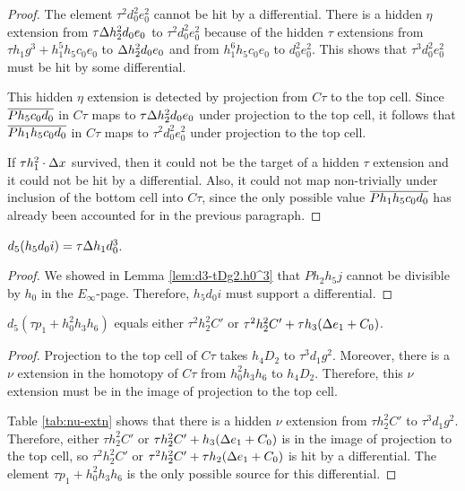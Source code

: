 \begin{proof}
The element $\tau^2 d_0^2 e_0^2$ cannot be hit by a differential.
There is a hidden $\eta$ extension
from $\tau \Delta h_2^2 d_0 e_0$ to $\tau^2 d_0^2 e_0^2$
because of the hidden $\tau$ extensions
from $\tau h_1 g^3 + h_1^5 h_5 c_0 e_0$ to
$\Delta h_2^2 d_0 e_0$ and
from $h_1^6 h_5 c_0 e_0$ to $d_0^2 e_0^2$.
This shows that $\tau^3 d_0^2 e_0^2$ must be hit by some differential.

This hidden $\eta$ extension is detected by
projection from $C\tau$ to the top cell.
Since $\overline{P h_5 c_0 d_0}$ in $C\tau$ maps to
$\tau \Delta h_2^2 d_0 e_0$ under projection to the top cell,
it follows that $\overline{P h_1 h_5 c_0 d_0}$ in $C\tau$
maps to $\tau^2 d_0^2 e_0^2$ under projection to the top cell.

If $\tau h_1^2 \cdot \Delta x$ survived, then it could not be the target of
a hidden $\tau$ extension and it could not be hit by a differential.
Also, it could not map non-trivially under inclusion of
the bottom cell into $C\tau$, since the only possible value
$\overline{P h_1 h_5 c_0 d_0}$ has already been accounted for 
in the previous paragraph.
\end{proof}

\begin{lemma}
\label{lem:d5-h5d0i}
$d_5(h_5 d_0 i) = \tau \Delta h_1 d_0^3$.
\end{lemma}

\begin{proof}
We showed in Lemma \ref{lem:d3-tDg2.h0^3}
that $P h_2 h_5 j$ cannot be divisible by $h_0$ in the $E_\infty$-page.
Therefore, $h_5 d_0 i$ must support a differential.
\end{proof}

\begin{lemma}
\label{lem:d5-tp1+h0^2h3h6}
$d_5(\tau p_1 + h_0^2 h_3 h_6)$ equals either
$\tau^2 h_2^2 C'$ or $\tau^2 h_2^2 C' + \tau h_3(\Delta e_1 + C_0)$.
\end{lemma}

\begin{proof}
Projection to the top cell of $C\tau$ takes
$h_4 D_2$ to $\tau^3 d_1 g^2$.
Moreover,
there is a $\nu$ extension in the homotopy of $C\tau$
from $h_0^2 h_3 h_6$ to $h_4 D_2$.
Therefore, this $\nu$ extension must be in the image of
projection to the top cell.

Table \ref{tab:nu-extn} shows that there is a hidden
$\nu$ extension from
$\tau h_2^2 C'$ to $\tau^3 d_1 g^2$.
Therefore, either $\tau h_2^2 C'$ or
$\tau h_2^2 C' + h_3(\Delta e_1 + C_0)$ is in the image of
projection to the top cell, so
$\tau^2 h_2^2 C'$ or $\tau^2 h_2^2 C' + \tau h_2 (\Delta e_1 + C_0)$
is hit by a differential.
The element $\tau p_1 + h_0^2 h_3 h_6$ is the 
only possible source for this differential.
\end{proof}

